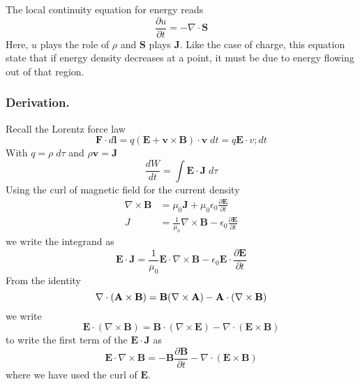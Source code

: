 \documentclass[../../../main.tex]{subfiles}
\begin{document}
The local continuity equation for energy reads
\begin{equation*}
    \frac{\partial u}{\partial t}=-\nabla\cdot\mathbf{S}
\end{equation*}
Here, $u$ plays the role of $\rho$ and $\mathbf{S}$ plays $\mathbf{J}$.
Like the case of charge, this equation state that if energy density decreases at a point, it must be due to energy flowing out of that region.
\subsubsection*{Derivation.}
Recall the Lorentz force law
\begin{equation*}
    \mathbf{F}\cdot d\mathbf{l}=q(\mathbf{E}+\mathbf{v}\times \mathbf{B})\cdot\mathbf{v}\;dt=q\mathbf{E}\cdot v;dt
\end{equation*}
With $q=\rho\;d\tau$ and $\rho\mathbf{v}=\mathbf{J}$
\begin{equation*}
    \frac{dW}{dt}=\int \mathbf{E}\cdot\mathbf{J}\;d\tau
\end{equation*}
Using the curl of magnetic field for the current density
\begin{align*}
    \nabla\times\mathbf{B} & =\mu_0\mathbf{J}+\mu_0\epsilon_0\frac{\partial \mathbf{E}}{\partial t}                   \\
    J                      & =\frac{1}{\mu_0}\nabla\times \mathbf{B}-\epsilon_0\frac{\partial \mathbf{E}}{\partial t}
\end{align*}
we write the integrand as
\begin{equation*}
    \mathbf{E}\cdot\mathbf{J}=\frac{1}{\mu_0}\mathbf{E}\cdot\nabla\times\mathbf{B}-\epsilon_0\mathbf{E}\cdot\frac{\partial \mathbf{E}}{\partial t}
\end{equation*}
From the identity
\begin{equation*}
    \nabla\cdot(\mathbf{A}\times\mathbf{B})=\mathbf{B}(\nabla\times\mathbf{A})-\mathbf{A}\cdot(\nabla\times\mathbf{B})
\end{equation*}
we write
\begin{equation*}
    \mathbf{E}\cdot(\nabla\times\mathbf{B})=\mathbf{B}\cdot(\nabla\times\mathbf{E})-\nabla\cdot(\mathbf{E}\times\mathbf{B})
\end{equation*}
to write the first term of the $\mathbf{E}\cdot\mathbf{J}$ as
\begin{equation*}
    \mathbf{E}\cdot\nabla\times\mathbf{B}=-\mathbf{B}\frac{\partial \mathbf{B}}{\partial t}-\nabla\cdot(\mathbf{E}\times \mathbf{B})
\end{equation*}
where we have used the curl of $\mathbf{E}$.
\end{document}
